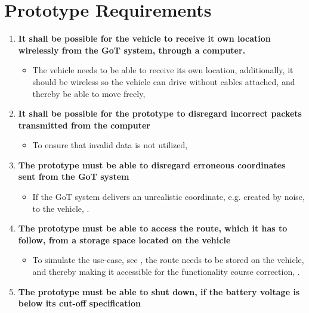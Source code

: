 \chapter{Prototype Requirements} \label{Requirements}

\begin{enumerate}
\item \textbf{It shall be possible for the vehicle to receive it own location wirelessly from the GoT system, through a computer.}
	\begin{itemize}
	\item[] The vehicle needs to be able to receive its own location, additionally, it should be wireless so the vehicle can drive without cables attached, and thereby be able to move freely, 
	\end{itemize}
\item \textbf{It shall be possible for the prototype to disregard incorrect packets transmitted from the computer}
	\begin{itemize}
	\item[] To ensure that invalid data is not utilized, 
	\end{itemize}
	\item \textbf{The prototype must be able to disregard erroneous coordinates sent from the GoT system}
	\begin{itemize}
	\item[] If the GoT system delivers an unrealistic coordinate, e.g. created by noise, to the vehicle, .
	\end{itemize}
\item \textbf{The prototype must be able to access the route, which it has to follow, from a storage space located on the vehicle}
	\begin{itemize}
	\item[] To simulate the use-case, see , the route needs to be stored on the vehicle, and thereby making it accessible for the functionality course correction, .
	\end{itemize}
\item \textbf{The prototype must be able to shut down, if the battery voltage is below its cut-off specification}

\end{enumerate}
